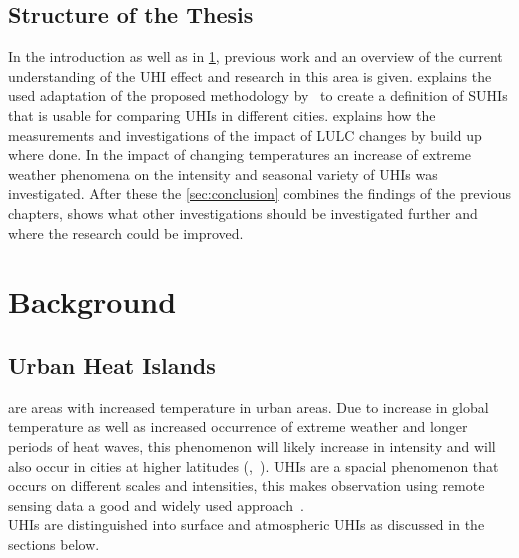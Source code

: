 \documentclass[12pt,a4paper, english,twoside]{article}
\begin{document}
  \subsection{Structure of the Thesis}\label{ssec:structure} 
    In the introduction as well as in \cref{sec:background}, previous work and an overview of the current understanding of the \gls{UHI} effect and research in this area is given. 
     explains the used adaptation of the proposed methodology by~\cite{Sobrino2020} to create a definition of \glspl{SUHI} that is usable for comparing \glspl{UHI} in different cities.  
     explains how the measurements  and investigations of the impact of \gls{LULC} changes by build up where done.
    In  the impact of changing temperatures an increase of extreme weather phenomena on the intensity and seasonal variety of \glspl{UHI} was investigated. 
    After these the \cref{sec:conclusion} combines the findings of the previous chapters, shows what other investigations should be investigated further and where the research could be improved. 
%
\newpage
\section{Background}\label{sec:background}
  \subsection{Urban Heat Islands}\label{sec:uhi}
     are areas with increased temperature in urban areas.
    Due to increase in global temperature as well as increased occurrence of extreme weather and longer periods of heat waves, this phenomenon will likely increase in intensity and will also occur in cities at higher latitudes (\cite{Sachindra2016},~\cite[p.~904]{Wilby2008}).
    \glspl{UHI} are a spacial phenomenon that occurs on different scales and intensities, this makes observation using remote sensing data a good and widely used approach~\autocite{Weng2003}.\\
    \glspl{UHI} are distinguished into surface and atmospheric \glspl{UHI} as discussed in the sections below. 
\end{document}
